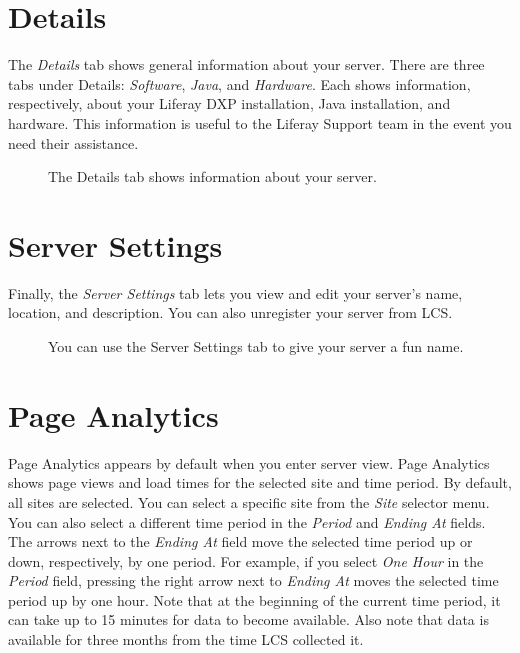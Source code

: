 \noindent\hrulefill

\section{Details}\label{details}

The \emph{Details} tab shows general information about your server.
There are three tabs under Details: \emph{Software}, \emph{Java}, and
\emph{Hardware}. Each shows information, respectively, about your
Liferay DXP installation, Java installation, and hardware. This
information is useful to the Liferay Support team in the event you need
their assistance.

\begin{figure}
\centering
{}
\caption{The Details tab shows information about your server.}
\end{figure}

\section{Server Settings}\label{server-settings}

Finally, the \emph{Server Settings} tab lets you view and edit your
server's name, location, and description. You can also unregister your
server from LCS.

\begin{figure}
\centering
{}
\caption{You can use the Server Settings tab to give your server a fun
name.}
\end{figure}

\section{Page Analytics}\label{page-analytics}

Page Analytics appears by default when you enter server view. Page
Analytics shows page views and load times for the selected site and time
period. By default, all sites are selected. You can select a specific
site from the \emph{Site} selector menu. You can also select a different
time period in the \emph{Period} and \emph{Ending At} fields. The arrows
next to the \emph{Ending At} field move the selected time period up or
down, respectively, by one period. For example, if you select \emph{One
Hour} in the \emph{Period} field, pressing the right arrow next to
\emph{Ending At} moves the selected time period up by one hour. Note
that at the beginning of the current time period, it can take up to 15
minutes for data to become available. Also note that data is available
for three months from the time LCS collected it.

